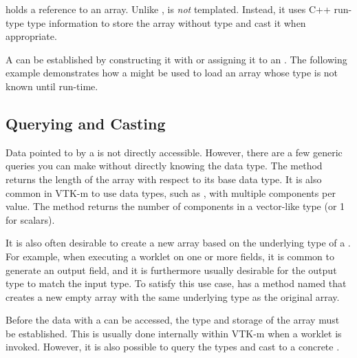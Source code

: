  holds a reference to an array. Unlike
,  is
\emph{not} templated. Instead, it uses C++ run-type type information to
store the array without type and cast it when appropriate.

A  can be established by constructing it
with or assigning it to an . The following
example demonstrates how a  might be
used to load an array whose type is not known until run-time.


\subsection{Querying and Casting}
\label{sec:DynamicArrayHandleQueryingAndCasting}

Data pointed to by a  is not directly
accessible. However, there are a few generic queries you can make without
directly knowing the data type. The  method
returns the length of the array with respect to its base data type. It is
also common in VTK-m to use data types, such as , with multiple
components per value. The  method returns
the number of components in a vector-like type (or 1 for scalars).


It is also often desirable to create a new array based on the underlying
type of a . For example, when executing
a worklet  on one or more fields, it is common to generate
an output field, and it is furthermore usually desirable for the output
type to match the input type. To satisfy this use case,
 has a method named
 that creates a new empty array with the same
underlying type as the original array.


Before the data with a  can be accessed,
the type and storage of the array must be established. This is usually done
internally within VTK-m when a worklet  is invoked.
However, it is also possible to query the types and cast to a concrete
.

